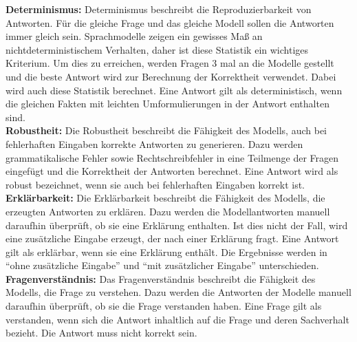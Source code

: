 \noindent\textbf{Determinismus:}\newline
Determinismus beschreibt die Reproduzierbarkeit von Antworten.
Für die gleiche Frage und das gleiche Modell sollen die Antworten immer gleich sein.
Sprachmodelle zeigen ein gewisses Maß an nichtdeterministischem Verhalten, daher ist diese Statistik ein wichtiges Kriterium.
Um dies zu erreichen, werden Fragen 3 mal an die Modelle gestellt und die beste Antwort wird zur Berechnung der Korrektheit verwendet.
Dabei wird auch diese Statistik berechnet.
Eine Antwort gilt als deterministisch, wenn die gleichen Fakten mit leichten Umformulierungen in der Antwort enthalten sind.\\

\noindent\textbf{Robustheit:}\newline
Die Robustheit beschreibt die Fähigkeit des Modells, auch bei fehlerhaften Eingaben korrekte Antworten zu generieren.
Dazu werden grammatikalische Fehler sowie Rechtschreibfehler in eine Teilmenge der Fragen eingefügt und die Korrektheit der Antworten berechnet.
Eine Antwort wird als robust bezeichnet, wenn sie auch bei fehlerhaften Eingaben korrekt ist.\\

\noindent\textbf{Erklärbarkeit:}\newline
Die Erklärbarkeit beschreibt die Fähigkeit des Modells, die erzeugten Antworten zu erklären.
Dazu werden die Modellantworten manuell daraufhin überprüft, ob sie eine Erklärung enthalten.
Ist dies nicht der Fall, wird eine zusätzliche Eingabe erzeugt, der nach einer Erklärung fragt.
Eine Antwort gilt als erklärbar, wenn sie eine Erklärung enthält.
Die Ergebnisse werden in \enquote{ohne zusätzliche Eingabe} und \enquote{mit zusätzlicher Eingabe} unterschieden.\\

\noindent\textbf{Fragenverständnis:}\newline
Das Fragenverständnis beschreibt die Fähigkeit des Modells, die Frage zu verstehen.
Dazu werden die Antworten der Modelle manuell daraufhin überprüft, ob sie die Frage verstanden haben. Eine Frage gilt als verstanden, wenn sich die Antwort inhaltlich auf die Frage und deren Sachverhalt bezieht. Die Antwort muss nicht korrekt sein.

